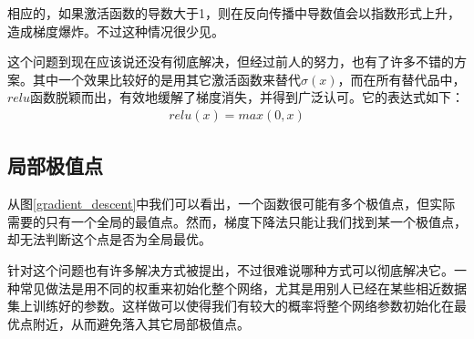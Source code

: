 \documentclass[UTF8]{ctexart}
\begin{document}
        		\indent 相应的，如果激活函数的导数大于1，则在反向传播中导数值会以指数形式上升，造成梯度爆炸。不过这种情况很少见。
        		
        		\indent 这个问题到现在应该说还没有彻底解决，但经过前人的努力，也有了许多不错的方案。其中一个效果比较好的是用其它激活函数来替代$\sigma(x)$，而在所有替代品中，$relu$函数脱颖而出，有效地缓解了梯度消失，并得到广泛认可。它的表达式如下：	
        		\begin{equation}
        			\begin{split}
        				relu(x) = max(0, x)
        			\end{split}	
        		\end{equation}
        		
        		\subsection{局部极值点}
        		\indent 从图\ref{gradient_descent}中我们可以看出，一个函数很可能有多个极值点，但实际需要的只有一个全局的最值点。然而，梯度下降法只能让我们找到某一个极值点，却无法判断这个点是否为全局最优。
        		
        		\indent 针对这个问题也有许多解决方式被提出，不过很难说哪种方式可以彻底解决它。一种常见做法是用不同的权重来初始化整个网络，尤其是用别人已经在某些相近数据集上训练好的参数。这样做可以使得我们有较大的概率将整个网络参数初始化在最优点附近，从而避免落入其它局部极值点。
    		
    		
%    		
%    		
%    		
%			
\end{document}
